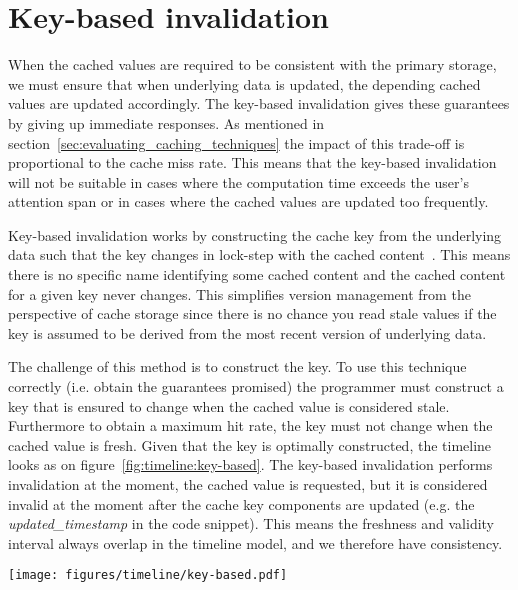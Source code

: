 
\section{Key-based invalidation}
\label{subsec:key_based_invalidation}

When the cached values are required to be consistent with the primary storage, we must ensure that when underlying data is updated, the depending cached values are updated accordingly. The key-based invalidation gives these guarantees by giving up immediate responses. As mentioned in section~\ref{sec:evaluating_caching_techniques} the impact of this trade-off is proportional to the cache miss rate. This means that the key-based invalidation will not be suitable in cases where the computation time exceeds the user's attention span or in cases where the cached values are updated too frequently.

Key-based invalidation works by constructing the cache key from the underlying data such that the key changes in lock-step with the cached content~\cite{blog:key-based-invalidation}. This means there is no specific name identifying some cached content and the cached content for a given key never changes. This simplifies version management from the perspective of cache storage since there is no chance you read stale values if the key is assumed to be derived from the most recent version of underlying data.

The challenge of this method is to construct the key. To use this technique correctly (i.e. obtain the guarantees promised) the programmer must construct a key that is ensured to change when the cached value is considered stale. Furthermore to obtain a maximum hit rate, the key must not change when the cached value is fresh. Given that the key is optimally constructed, the timeline looks as on figure~\ref{fig:timeline:key-based}. The key-based invalidation performs invalidation at the moment, the cached value is requested, but it is considered invalid at the moment after the cache key components are updated (e.g. the \emph{updated\_timestamp} in the code snippet). This means the freshness and validity interval always overlap in the timeline model, and we therefore have consistency.

\begin{figure*}[ht!]
  \centering
  \texttt{[image: figures/timeline/key-based.pdf]}
  \caption{The lifecycle of the key-based invalidation technique}
  \label{fig:timeline:key-based}
\end{figure*}

